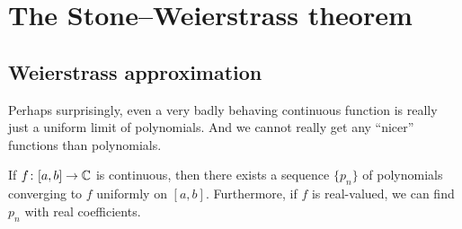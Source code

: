 
\sectionnewpage
\section{The Stone--Weierstrass theorem}
\label{sec:stoneweier}


\subsection{Weierstrass approximation}

Perhaps surprisingly, even a very badly behaving continuous function is really
just a uniform limit of polynomials.
And we cannot really get any ``nicer''
functions than polynomials.

\begin{thm}
If $f \colon [a,b] \to {\mathbb{C}}$ is continuous, then there exists a sequence $\{
p_n \}$ of polynomials converging to $f$ uniformly on $[a,b]$.
Furthermore, if $f$ is real-valued, we can find $p_n$ with real coefficients.
\end{thm}

